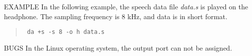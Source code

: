 \begin{qsection}{EXAMPLE}
In the following example, the speech data file {\em data.s}
is played on the headphone.
The sampling frequency is 8 kHz, and data is in short format.
\begin{quote}
\verb! da +s -s 8 -o h data.s!
\end{quote}
\end{qsection}

\begin{qsection}{BUGS}
In the Linux operating system, the output port can not be assigned.
\end{qsection}

